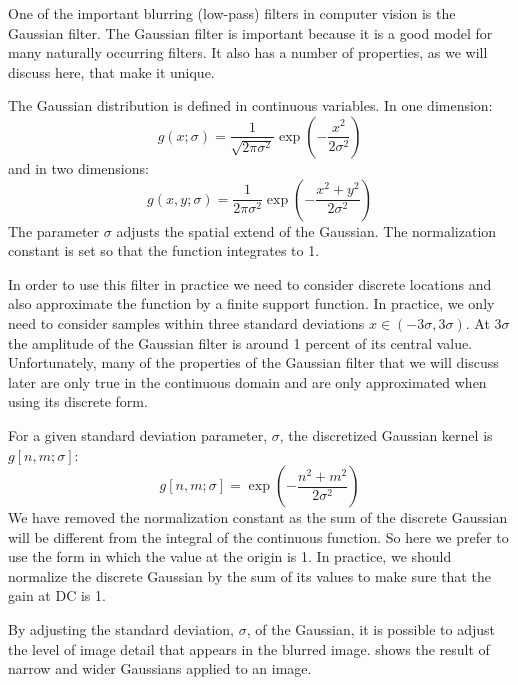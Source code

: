 One of the important blurring (low-pass) filters in computer vision is the Gaussian filter.
The Gaussian filter is important because it is a good model for many naturally occurring filters. It also has a number of properties, as we will discuss here, that make it unique.

The Gaussian distribution is defined in continuous variables. In one dimension:
\begin{equation}
	g(x; \sigma) = \frac{1}{\sqrt{2 \pi \sigma^2}} \exp{ \left( -\frac{x^2}{2 \sigma^2} \right) }
	\label{eq:gauss1dcont}
\end{equation}
and in two dimensions:
\begin{equation}
	g(x,y; \sigma) = \frac{1}{2 \pi \sigma^2} \exp{ \left(-\frac{x^2 +
			y^2}{2 \sigma^2} \right) }
	\label{eq:gauss2dcont}
\end{equation}
The parameter $\sigma$ adjusts the spatial extend of the Gaussian. The normalization constant is set so that the function integrates to 1.

In order to use this filter in practice we need to consider discrete locations and also approximate the function by a finite support function. In practice, we only need to consider samples within three standard deviations $x \in (-3\sigma, 3\sigma)$. At $3\sigma$ the amplitude of the Gaussian filter is around 1 percent of its central value. Unfortunately, many of the properties of the Gaussian filter that we will discuss later are only true in the continuous domain and are only approximated when using its discrete form.

For a given standard deviation parameter, $\sigma$, the discretized Gaussian kernel is $g \left[n, m; \sigma \right]$:
\begin{equation}
	g \left[ n,m; \sigma \right] = \exp{ \left( -\frac{n^2 + m^2}{2 \sigma^2} \right) }
	\label{eq:gauss2d}
\end{equation}
We have removed the normalization constant as the sum of the discrete Gaussian will be different from the integral of the continuous function. So here we prefer to use the form in which the value at the origin is 1. In practice, we should normalize the discrete Gaussian by the sum of its values to make sure that the gain at DC is 1. 

By adjusting the standard deviation, $\sigma$, of the Gaussian, it is possible to adjust the level of image detail
that appears in the blurred image. \Fig{\ref{fig:zebragaussian}} shows the result of narrow and wider Gaussians applied to an image.


